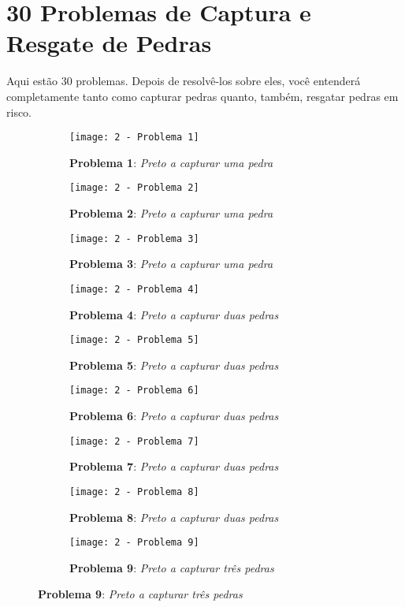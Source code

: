 \pagebreak

\section{30 Problemas de Captura e Resgate de Pedras}

Aqui estão 30 problemas. Depois de resolvê-los sobre eles, você entenderá completamente tanto como capturar pedras quanto, também, resgatar pedras em risco.

\begin{figure}[h!]
    \centering
    \begin{subfigure}[t]{.3\textwidth}
        \texttt{[image: 2 - Problema 1]}
        \caption*{\textbf{Problema 1}: \emph{Preto a capturar uma pedra}}
    \end{subfigure}
    \hfill
    \begin{subfigure}[t]{.3\textwidth}
        \texttt{[image: 2 - Problema 2]}
        \caption*{\textbf{Problema 2}: \emph{Preto a capturar uma pedra}}
    \end{subfigure}
    \hfill
    \begin{subfigure}[t]{.3\textwidth}
        \texttt{[image: 2 - Problema 3]}
        \caption*{\textbf{Problema 3}: \emph{Preto a capturar uma pedra}}
    \end{subfigure}
    \par\bigskip
    \begin{subfigure}[t]{.3\textwidth}
        \texttt{[image: 2 - Problema 4]}
        \caption*{\textbf{Problema 4}: \emph{Preto a capturar duas pedras}}
    \end{subfigure}
    \hfill
    \begin{subfigure}[t]{.3\textwidth}
        \texttt{[image: 2 - Problema 5]}
        \caption*{\textbf{Problema 5}: \emph{Preto a capturar duas pedras}}
    \end{subfigure}
    \hfill
    \begin{subfigure}[t]{.3\textwidth}
        \texttt{[image: 2 - Problema 6]}
        \caption*{\textbf{Problema 6}: \emph{Preto a capturar duas pedras}}
    \end{subfigure}
    \par\bigskip
    \begin{subfigure}[t]{.3\textwidth}
        \texttt{[image: 2 - Problema 7]}
        \caption*{\textbf{Problema 7}: \emph{Preto a capturar duas pedras}}
    \end{subfigure}
    \hfill
    \begin{subfigure}[t]{.3\textwidth}
        \texttt{[image: 2 - Problema 8]}
        \caption*{\textbf{Problema 8}: \emph{Preto a capturar duas pedras}}
    \end{subfigure}
    \hfill
    \begin{subfigure}[t]{.3\textwidth}
        \texttt{[image: 2 - Problema 9]}
        \caption*{\textbf{Problema 9}: \emph{Preto a capturar três pedras}}
    \end{subfigure}
\end{figure}

